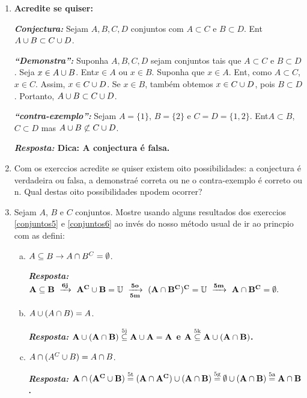 \begin{enumerate}[{\bf 1.}]
\item {\bf Acredite se quiser:}  

\noindent \textit{\textbf{Conjectura:}} Sejam $A,B,C,D$ conjuntos com $A\subset C$ e $B\subset D$. Ent\ao $A\cup B \subset C\cup D$. 

\noindent \textit{\textbf{``Demonstra\caoi'':}} Suponha $A,B,C,D$ sejam conjuntos tais que $A\subset C$ e $B\subset D$. Seja $x\in A\cup B$. Ent\ao $x\in A$ ou $x\in B$. Suponha que $x\in A$. Ent\aoi, como $A\subset C$, $x\in C$. Assim, $x\in C\cup D$. Se $x\in B$, tamb\'em obtemos $x\in C\cup D$, pois $B\subset D$. Portanto, $A\cup B\subset C\cup D$.

\noindent \textit{\textbf{``contra-exemplo'':}} Sejam $A=\{1\}$, $B=\{2\}$ e $C=D=\{1,2\}$. Ent\ao $A\subset B$, $C\subset D$ mas $A\cup B \not\subset C\cup D$.

{\bf{\it Resposta:} Dica: A conjectura \'e falsa.}

\item Com os exerc\ih cios acredite se quiser existem oito possibilidades: a conjectura \'e verdadeira ou falsa, a demonstra\cao \'e correta ou n\ao e o contra-exemplo \'e correto ou n\aoi. Qual destas oito possibilidades n\ao podem ocorrer?

\item Sejam $A$, $B$ e $C$ conjuntos. Mostre usando alguns resultados dos exerc\ih cios \ref{conjuntos5} e \ref{conjuntos6} ao inv\'es do nosso m\'etodo usual de ir ao princ\ih pio com as defini\cois:
\begin{enumerate}[a)]
\item $A\subseteq B \to A\cap B^C=\emptyset$.

{\bf{\it Resposta:} ${\bf A\subseteq B \textrm{ }\xrightarrow[]{6j}\textrm{ } A^C\cup B=\mathbb{U} \textrm{ }\xrightarrow[5m]{5o}\textrm{ } (A\cap B^C)^C=\mathbb{U} \textrm{ }\xrightarrow[]{5m}\textrm{ } A\cap B^C=\emptyset.}$}

\item $A\cup(A\cap B)=A$.

{\bf{\it Resposta:} ${\bf A\cup(A\cap B)\stackrel{\text{5j}}{\subseteq}A\cup A=A}$ e ${\bf A\stackrel{\text{5k}}{\subseteq} A\cup(A\cap B)}$.}

\item $A\cap(A^C\cup B)=A\cap B$. 

{\bf{\it Resposta:} ${\bf A\cap(A^C\cup B)\stackrel{\text{5t}}{=}(A\cap A^C)\cup(A\cap B)\stackrel{\text{5g}}{=}\emptyset\cup(A\cap B)\stackrel{\text{5a}}{=}A\cap B}$.}


\end{enumerate}
\end{enumerate}

